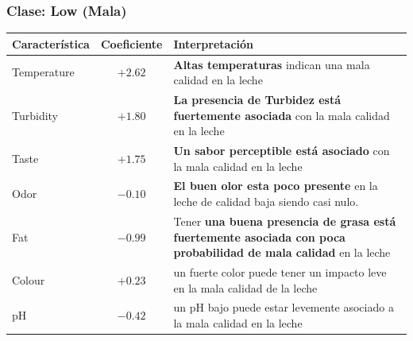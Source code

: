 \documentclass[12pt,a4paper]{article}
\begin{document}
\begin{itemize}
							\subsubsection*{Clase: Low (Mala)}
							\begin{center}
							\begin{tabular}{lcp{8cm}}
							\hline
							\textbf{Característica} & \textbf{Coeficiente} & \textbf{Interpretación} \\
							\hline
							Temperature & $\mathbf{+2.62}$ & \textbf{Altas temperaturas} indican una mala calidad en la leche \\
							Turbidity   & $+1.80$ & \textbf{La presencia de Turbidez está fuertemente asociada} con la mala calidad en la leche \\
							Taste       & $+1.75$ & \textbf{Un sabor perceptible está asociado} con la mala calidad en la leche \\
							Odor        & $-0.10$ & \textbf{El buen olor esta poco presente} en la leche de calidad baja siendo casi nulo.  \\
							Fat         & $-0.99$ & Tener \textbf{una buena presencia de grasa está fuertemente asociada con poca probabilidad de mala calidad} en la leche \\
							Colour      & $+0.23$ & un fuerte color puede tener un impacto leve en la mala calidad de la leche \\
							pH          & $-0.42$ & un pH bajo puede estar levemente asociado a la mala calidad en la leche \\
							\hline
							\end{tabular}
							\end{center}
							

\end{itemize}
\end{document}
